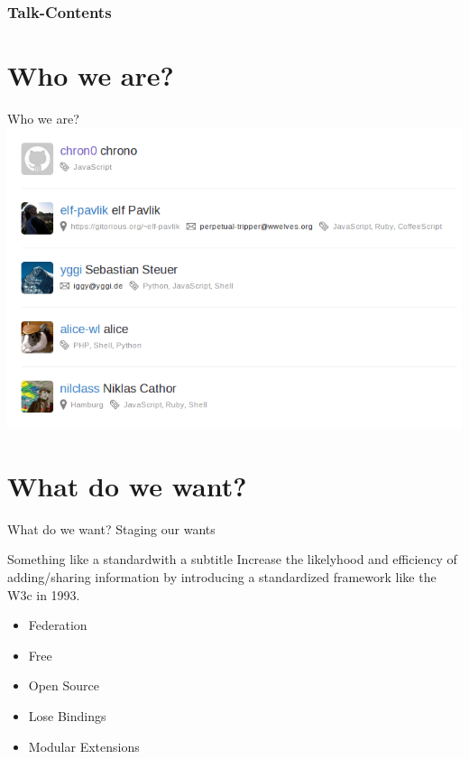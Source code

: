 \documentclass{beamer}
\begin{document}
\addtocounter{framenumber}{-1}


{
\begin{frame}[plain]
\frametitle{\vspace{-2.12ex}Talk-Contents}
 \tableofcontents
\end{frame}
}

\addtocounter{framenumber}{-1}
\setcounter{page}{1}

%
%

\section{Who we are?}

\begin{frame}{Who we are?}
 \vspace{1em}
 \includegraphics[scale=0.4]{dspace-hackers}
\end{frame}

\section{What do we want?}

\begin{frame}{What do we want?}
 Staging our wants
\end{frame}

\begin{frame}{Something like a standard}{with a subtitle}
 Increase the likelyhood and efficiency of adding/sharing information by introducing
 a standardized framework like the W3c in 1993.
 \begin{itemize}
  \item Federation
  \item Free
  \item Open Source
  \item Lose Bindings
  \item Modular Extensions
 \end{itemize}
\end{frame}
\end{document}
